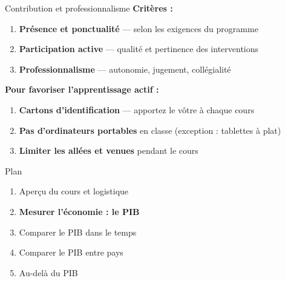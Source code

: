\documentclass[aspectratio=169]{beamer}
\begin{document}
\begin{frame}{Contribution et professionnalisme}
   \small
   \textbf{Crit\`eres :}
   \vspace{0.15cm}
   \begin{enumerate}
      \setlength\itemsep{0.2cm}
      \item \textbf{Pr\'esence et ponctualit\'e} --- selon les exigences du programme
      \item \textbf{Participation active} --- qualit\'e et pertinence des interventions
      \item \textbf{Professionnalisme} --- autonomie, jugement, coll\'egialit\'e
   \end{enumerate}
   \vspace{0.4cm}
   \textbf{Pour favoriser l'apprentissage actif :}
   \vspace{0.15cm}
   \begin{enumerate}
      \setlength\itemsep{0.2cm}
      \item \textbf{Cartons d'identification} --- apportez le v\^otre \`a chaque cours
      \item \textbf{Pas d'ordinateurs portables} en classe (exception : tablettes \`a plat)
      \item \textbf{Limiter les all\'ees et venues} pendant le cours
   \end{enumerate}
\end{frame}

\begin{frame}{Plan}
   \begin{enumerate}
      \setlength\itemsep{0.35cm}
      \item {\color{gray!50}Aper\c{c}u du cours et logistique}
      \item \textbf{Mesurer l'\'economie : le PIB}
      \item Comparer le PIB dans le temps
      \item Comparer le PIB entre pays
      \item Au-del\`a du PIB
   \end{enumerate}
\end{frame}

\end{document}
